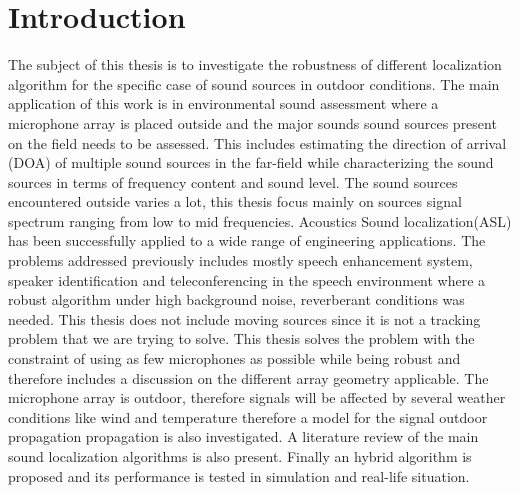 \section{Introduction}



The subject of this thesis is to investigate the robustness of different localization algorithm for the specific case of sound sources in outdoor conditions. The main application of this work is in environmental sound assessment where a microphone array is placed outside and the major sounds sound sources present on the field needs to be assessed. This includes estimating the direction of arrival (DOA) of multiple sound sources in the far-field while characterizing the sound sources in terms of frequency content and sound level. The sound sources encountered outside varies a lot, this thesis focus mainly on sources signal spectrum ranging from low to mid frequencies. Acoustics Sound localization(ASL) has been successfully applied to a wide range of engineering applications. The problems addressed previously includes mostly speech enhancement system, speaker identification and teleconferencing in the speech environment where a robust algorithm under high background noise, reverberant conditions was needed. This thesis does not include moving sources since it is not a tracking problem that we are trying to solve. This thesis solves the problem with the constraint of using as few microphones as possible while being robust and therefore includes a discussion on the different array geometry applicable. The microphone array is outdoor, therefore signals will be affected by several weather conditions like wind and temperature therefore a model for the signal outdoor propagation propagation is also investigated. A literature review of the main sound localization algorithms is also present. Finally an hybrid algorithm is proposed and its performance is tested in simulation and real-life situation.




